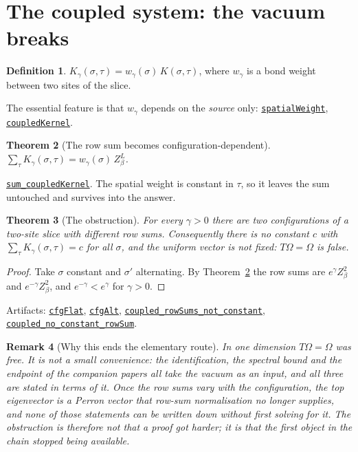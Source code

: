 \documentclass[11pt]{article}
\newtheorem{theorem}{Theorem}[section]
\newtheorem{remark}[theorem]{Remark}
\theoremstyle{definition}
\newtheorem{definition}[theorem]{Definition}
\newcommand{\anchor}{d8187d7f9caa9ce93a58a70a382e98a239942afe}
\newcommand{\osline}[3]{%
  \href{https://github.com/lluiseriksson/THE-ERIKSSON-PROGRAMME/blob/\anchor/YangMills/OS/#1.lean\#L#2}{\nolinkurl{#3}}}
\newcommand{\Om}{\Omega}
\begin{document}
\section{The coupled system: the vacuum breaks}

\begin{definition}
$K_\gamma(\sigma,\tau) = w_\gamma(\sigma)\,K(\sigma,\tau)$, where
$w_\gamma$ is a bond weight between two sites of the slice.
\end{definition}

The essential feature is that $w_\gamma$ depends on the \emph{source} only:
\osline{SpatialExtent}{171}{spatialWeight},
\osline{SpatialExtent}{176}{coupledKernel}.

\begin{theorem}[The row sum becomes configuration-dependent]\label{thm:coupled}
$\displaystyle\sum_\tau K_\gamma(\sigma,\tau) = w_\gamma(\sigma)\,Z_\beta^{L}$.
\end{theorem}

\osline{SpatialExtent}{181}{sum\_coupledKernel}.  The spatial weight is constant
in $\tau$, so it leaves the sum untouched and survives into the answer.

\begin{theorem}[The obstruction]\label{thm:obstruction}
For every $\gamma>0$ there are two configurations of a two-site slice with
different row sums.  Consequently there is no constant $c$ with
$\sum_\tau K_\gamma(\sigma,\tau)=c$ for all $\sigma$, and the uniform vector is
not fixed: $T\Om=\Om$ is false.
\end{theorem}

\begin{proof}
Take $\sigma$ constant and $\sigma'$ alternating.  By
Theorem~\ref{thm:coupled} the row sums are $e^{\gamma}Z_\beta^{2}$ and
$e^{-\gamma}Z_\beta^{2}$, and $e^{-\gamma}<e^{\gamma}$ for $\gamma>0$.
\end{proof}

Artifacts: \osline{SpatialExtent}{188}{cfgFlat},
\osline{SpatialExtent}{190}{cfgAlt},
\osline{SpatialExtent}{208}{coupled\_rowSums\_not\_constant},
\osline{SpatialExtent}{224}{coupled\_no\_constant\_rowSum}.

\begin{remark}[Why this ends the elementary route]
In one dimension $T\Om=\Om$ was free.  It is not a small convenience: the
identification, the spectral bound and the endpoint of the companion papers all
take the vacuum as an input, and all three are stated in terms of it.  Once the
row sums vary with the configuration, the top eigenvector is a Perron vector
that row-sum normalisation no longer supplies, and none of those statements can
be written down without first solving for it.  The obstruction is therefore not that a proof got
harder; it is that the first object in the chain stopped being available.
\end{remark}
\end{document}
